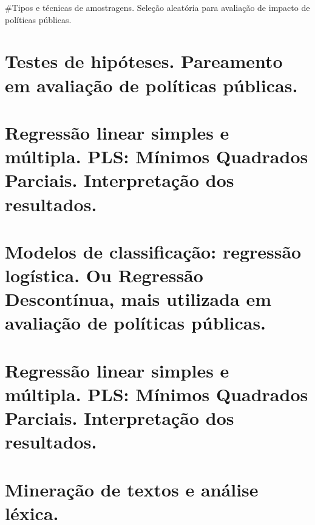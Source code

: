 \documentclass[
]{book}
\begin{document}
\#Tipos e técnicas de amostragens. Seleção aleatória para avaliação de impacto de políticas públicas.

\hypertarget{testes-de-hipuxf3teses.-pareamento-em-avaliauxe7uxe3o-de-poluxedticas-puxfablicas.}{%
\chapter{Testes de hipóteses. Pareamento em avaliação de políticas públicas.}\label{testes-de-hipuxf3teses.-pareamento-em-avaliauxe7uxe3o-de-poluxedticas-puxfablicas.}}

\hypertarget{regressuxe3o-linear-simples-e-muxfaltipla.-pls-muxednimos-quadrados-parciais.-interpretauxe7uxe3o-dos-resultados.}{%
\chapter{Regressão linear simples e múltipla. PLS: Mínimos Quadrados Parciais. Interpretação dos resultados.}\label{regressuxe3o-linear-simples-e-muxfaltipla.-pls-muxednimos-quadrados-parciais.-interpretauxe7uxe3o-dos-resultados.}}

\hypertarget{modelos-de-classificauxe7uxe3o-regressuxe3o-loguxedstica.-ou-regressuxe3o-descontuxednua-mais-utilizada-em-avaliauxe7uxe3o-de-poluxedticas-puxfablicas.}{%
\chapter{Modelos de classificação: regressão logística. Ou Regressão Descontínua, mais utilizada em avaliação de políticas públicas.}\label{modelos-de-classificauxe7uxe3o-regressuxe3o-loguxedstica.-ou-regressuxe3o-descontuxednua-mais-utilizada-em-avaliauxe7uxe3o-de-poluxedticas-puxfablicas.}}

\hypertarget{regressuxe3o-linear-simples-e-muxfaltipla.-pls-muxednimos-quadrados-parciais.-interpretauxe7uxe3o-dos-resultados.-1}{%
\chapter{Regressão linear simples e múltipla. PLS: Mínimos Quadrados Parciais. Interpretação dos resultados.}\label{regressuxe3o-linear-simples-e-muxfaltipla.-pls-muxednimos-quadrados-parciais.-interpretauxe7uxe3o-dos-resultados.-1}}

\hypertarget{minerauxe7uxe3o-de-textos-e-anuxe1lise-luxe9xica.}{%
\chapter{Mineração de textos e análise léxica.}\label{minerauxe7uxe3o-de-textos-e-anuxe1lise-luxe9xica.}}

  
\end{document}
